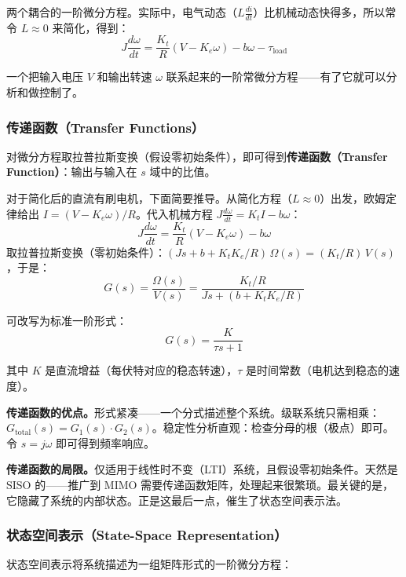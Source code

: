 两个耦合的一阶微分方程。实际中，电气动态（$L \frac{di}{dt}$）比机械动态快得多，所以常令 $L \approx 0$ 来简化，得到：
\begin{equation}
J \frac{d\omega}{dt} = \frac{K_t}{R}(V - K_e \omega) - b\omega - \tau_{\text{load}}
\end{equation}

一个把输入电压 $V$ 和输出转速 $\omega$ 联系起来的一阶常微分方程——有了它就可以分析和做控制了。

\subsubsection{传递函数（Transfer Functions）}

对微分方程取拉普拉斯变换（假设零初始条件），即可得到\textbf{传递函数（Transfer Function）}：输出与输入在 $s$ 域中的比值。

对于简化后的直流有刷电机，下面简要推导。从简化方程（$L \approx 0$）出发，欧姆定律给出 $I = (V - K_e \omega)/R$。代入机械方程 $J\frac{d\omega}{dt} = K_t I - b\omega$：
\[
J\frac{d\omega}{dt} = \frac{K_t}{R}(V - K_e \omega) - b\omega
\]
取拉普拉斯变换（零初始条件）：$(Js + b + K_t K_e / R)\,\Omega(s) = (K_t / R)\,V(s)$，于是：
\begin{equation}
G(s) = \frac{\Omega(s)}{V(s)} = \frac{K_t / R}{Js + (b + K_t K_e / R)}
\end{equation}

可改写为标准一阶形式：
\begin{equation}
G(s) = \frac{K}{\tau s + 1}
\end{equation}

其中 $K$ 是直流增益（每伏特对应的稳态转速），$\tau$ 是时间常数（电机达到稳态的速度）。

\textbf{传递函数的优点。}\;形式紧凑——一个分式描述整个系统。级联系统只需相乘：$G_{\text{total}}(s) = G_1(s) \cdot G_2(s)$。稳定性分析直观：检查分母的根（极点）即可。令 $s = j\omega$ 即可得到频率响应。

\textbf{传递函数的局限。}\;仅适用于线性时不变（LTI）系统，且假设零初始条件。天然是 SISO 的——推广到 MIMO 需要传递函数矩阵，处理起来很繁琐。最关键的是，它隐藏了系统的内部状态。正是这最后一点，催生了状态空间表示法。

\subsubsection{状态空间表示（State-Space Representation）}

状态空间表示将系统描述为一组矩阵形式的一阶微分方程：

